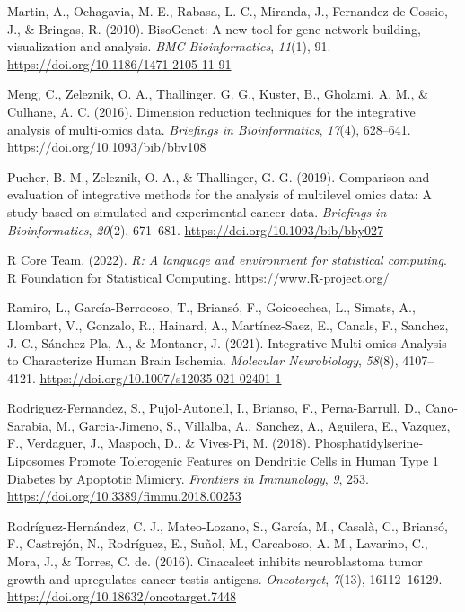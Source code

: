 \documentclass[a4paper, nobind]{templates/ociamthesis}
\newlength{\cslhangindent}
\newenvironment{CSLReferences}[2] %
 {%
  \setlength{\parindent}{0pt}
  \ifodd #1
  \let\oldpar\par
  \def\par{\hangindent=\cslhangindent\oldpar}
  \fi
  \setlength{\parskip}{1mm}
  \setlength{\baselineskip}{6mm}
 }%
 {}
\begin{document}
\begin{CSLReferences}{1}{0}
\leavevmode{}%
Martin, A., Ochagavia, M. E., Rabasa, L. C., Miranda, J., Fernandez-de-Cossio, J., \& Bringas, R. (2010). {BisoGenet}: A new tool for gene network building, visualization and analysis. \emph{BMC Bioinformatics}, \emph{11}(1), 91. \url{https://doi.org/10.1186/1471-2105-11-91}

\leavevmode{}%
Meng, C., Zeleznik, O. A., Thallinger, G. G., Kuster, B., Gholami, A. M., \& Culhane, A. C. (2016). Dimension reduction techniques for the integrative analysis of multi-omics data. \emph{Briefings in Bioinformatics}, \emph{17}(4), 628--641. \url{https://doi.org/10.1093/bib/bbv108}

\leavevmode{}%
Pucher, B. M., Zeleznik, O. A., \& Thallinger, G. G. (2019). Comparison and evaluation of integrative methods for the analysis of multilevel omics data: A study based on simulated and experimental cancer data. \emph{Briefings in Bioinformatics}, \emph{20}(2), 671--681. \url{https://doi.org/10.1093/bib/bby027}

\leavevmode{}%
R Core Team. (2022). \emph{R: A language and environment for statistical computing}. R Foundation for Statistical Computing. \url{https://www.R-project.org/}

\leavevmode{}%
Ramiro, L., García-Berrocoso, T., Briansó, F., Goicoechea, L., Simats, A., Llombart, V., Gonzalo, R., Hainard, A., Martínez-Saez, E., Canals, F., Sanchez, J.-C., Sánchez-Pla, A., \& Montaner, J. (2021). Integrative {Multi}-omics {Analysis} to {Characterize} {Human} {Brain} {Ischemia}. \emph{Molecular Neurobiology}, \emph{58}(8), 4107--4121. \url{https://doi.org/10.1007/s12035-021-02401-1}

\leavevmode{}%
Rodriguez-Fernandez, S., Pujol-Autonell, I., Brianso, F., Perna-Barrull, D., Cano-Sarabia, M., Garcia-Jimeno, S., Villalba, A., Sanchez, A., Aguilera, E., Vazquez, F., Verdaguer, J., Maspoch, D., \& Vives-Pi, M. (2018). Phosphatidylserine-{Liposomes} {Promote} {Tolerogenic} {Features} on {Dendritic} {Cells} in {Human} {Type} 1 {Diabetes} by {Apoptotic} {Mimicry}. \emph{Frontiers in Immunology}, \emph{9}, 253. \url{https://doi.org/10.3389/fimmu.2018.00253}

\leavevmode{}%
Rodríguez-Hernández, C. J., Mateo-Lozano, S., García, M., Casalà, C., Briansó, F., Castrejón, N., Rodríguez, E., Suñol, M., Carcaboso, A. M., Lavarino, C., Mora, J., \& Torres, C. de. (2016). Cinacalcet inhibits neuroblastoma tumor growth and upregulates cancer-testis antigens. \emph{Oncotarget}, \emph{7}(13), 16112--16129. \url{https://doi.org/10.18632/oncotarget.7448}


\end{CSLReferences}
\end{document}
